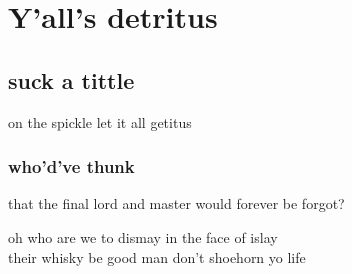 \chapter{Y'all's detritus}
\section{suck a tittle}
on the spickle let it all getitus
\subsection{who'd've thunk}
that the final lord and master would forever be forgot?

oh who are we to dismay in the face of islay\\
their whisky be good man don't shoehorn yo life
